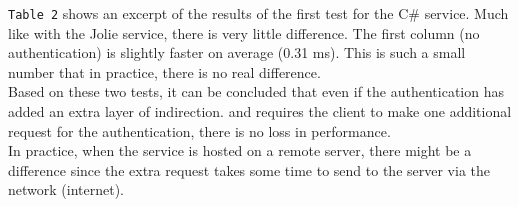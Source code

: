 \documentclass[12pt,a4paper]{article}
\begin{document}
\texttt{Table 2} shows an excerpt of the results of the first test for the C\# service. Much like with the Jolie service, there is very little difference. The first column (no authentication) is slightly faster on average (0.31 ms). This is such a small number that in practice, there is no real difference.\\

Based on these two tests, it can be concluded that even if the authentication has added an extra layer of indirection. and requires the client to make one additional request for the authentication, there is no loss in performance.\\
In practice, when the service is hosted on a remote server, there might be a difference since the extra request takes some time to send to the server via the network (internet).\\
\end{document}
